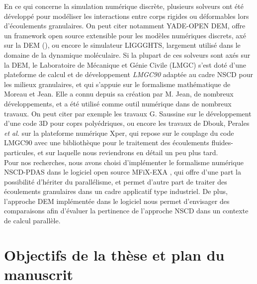 En ce qui concerne la simulation numérique discrète, plusieurs solveurs ont été développé pour modéliser les interactions entre corps rigides ou déformables lors d'écoulements granulaires. On peut citer notamment YADE-OPEN DEM, offre un framework open source extensible pour les modèles numériques discrets, axé sur la DEM (\cite{vsmilauer2010yade, kozicki2009yade}), ou encore le simulateur LIGGGHTS\cite{goniva2010open}, largement utilisé dans le domaine de la dynamique moléculaire. Si la plupart de ces solveurs sont axés sur la DEM, le Laboratoire de Mécanique et Génie Civile (LMGC) s'est doté d'une plateforme de calcul et de développement \textit{LMGC90} \cite{dubois2013lmgc90} adaptée au cadre NSCD pour les milieux granulaires, et qui s'appuie sur le formalisme mathématique de Moreau et Jean. Elle a connu depuis sa création par M. Jean, de nombreux développements, et a été utilisé comme outil numérique dans de nombreux travaux. On peut citer par exemple les travaux G. Saussine \cite{saussine2004contribution} sur le développement d'une code 3D pour coprs polyédriques, ou encore les travaux de Dbouk, Perales \textit{et al.} \cite{dbouk2016df} sur la plateforme numérique Xper, qui repose sur le couplage du code LMGC90 avec une bibliothèque pour le traitement des écoulements fluides-particules, et sur laquelle nous reviendrons en détail un peu plus tard.\\
Pour nos recherches, nous avons choisi d'implémenter le formalisme numérique NSCD-PDAS dans le logiciel open source MFiX-EXA \cite{garg2012documentation}, qui offre d'une part la possibilité d'hériter du parallélisme, et permet d'autre part de traiter des écoulements granulaires dans un cadre applicatif type industriel. De plus, l'approche DEM implémentée dans le logiciel nous permet d'envisager des comparaisons afin d'évaluer la pertinence de l'approche NSCD dans un contexte de calcul parallèle.

\section{Objectifs de la thèse et plan du manuscrit}

